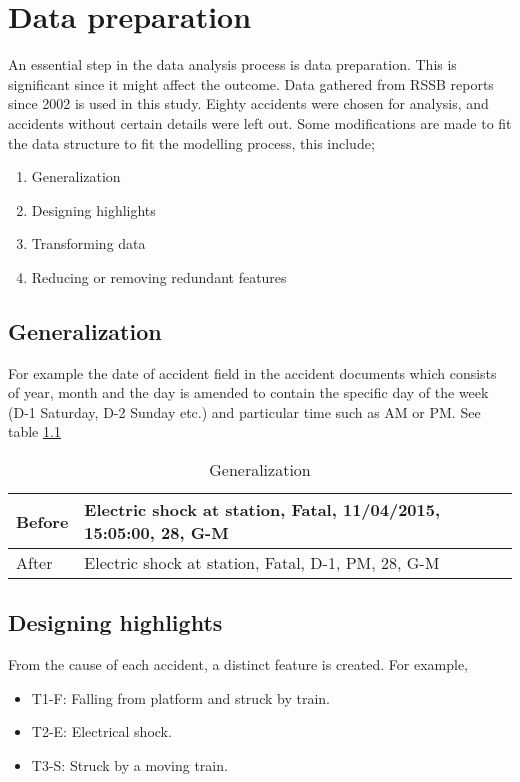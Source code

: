\chapter{Data preparation}
An essential step in the data analysis process is data preparation. This is significant since it might affect the outcome. Data gathered from RSSB reports since 2002 is used in this study. Eighty accidents were chosen for analysis, and accidents without certain details were left out. Some modifications are made to fit the data structure to fit the modelling process, this include;

\begin{enumerate}
    \item Generalization
    \item Designing highlights
    \item Transforming data 
    \item Reducing or removing redundant features
\end{enumerate}


\section{Generalization}
For example the date of accident field in the accident documents which consists of year, month and the day is amended to contain the specific day of the week (D-1 Saturday, D-2 Sunday etc.) and particular time such as AM or PM. See table \ref{tab:generalization}

\begin{table}[h!]
    \centering
    \begin{tabular}{l|l}
         Before &  Electric shock at station, Fatal, 11/04/2015, 15:05:00, 28, G-M\\
         \hline 
         After & Electric shock at station, Fatal, D-1, PM, 28, G-M
    \end{tabular}
    \caption{Generalization}
    \label{tab:generalization}
\end{table}

\section{Designing highlights}
From the cause of each accident, a distinct feature is created. For example,

\begin{itemize}
    \item T1-F: Falling from platform and struck by train. 
    \item T2-E: Electrical shock. 
    \item T3-S: Struck by a moving train. 
\end{itemize}

